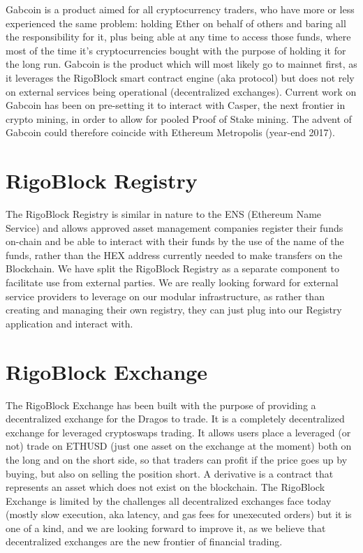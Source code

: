 \documentclass[9pt,oneside]{amsart}
\begin{document}
\begin{multicols}{2}
Gabcoin is a product aimed for all cryptocurrency traders, who have more or less experienced the same problem: holding Ether on behalf of others and baring all the responsibility for it, plus being able at any time to access those funds, where most of the time it’s cryptocurrencies bought with the purpose of holding it for the long run.
Gabcoin is the product which will most likely go to mainnet first, as it leverages the RigoBlock smart contract engine (aka protocol) but does not rely on external services being operational (decentralized exchanges). Current work on Gabcoin has been on pre-setting it to interact with Casper, the next frontier in crypto mining, in order to allow for pooled Proof of Stake mining. The advent of Gabcoin could therefore coincide with Ethereum Metropolis (year-end 2017).

\section{RigoBlock Registry}
The RigoBlock Registry is similar in nature to the ENS (Ethereum Name Service) and allows approved asset management companies register their funds on-chain and be able to interact with their funds by the use of the name of the funds, rather than the HEX address currently needed to make transfers on the Blockchain. We have split the RigoBlock Registry as a separate component to facilitate use from external parties. We are really looking forward for external service providers to leverage on our modular infrastructure, as rather than creating and managing their own registry, they can just plug into our Registry application and interact with.

\section{RigoBlock Exchange}
The RigoBlock Exchange has been built with the purpose of providing a decentralized exchange for the Dragos to trade. It is a completely decentralized exchange for leveraged cryptoswaps trading. It allows users place a leveraged (or not) trade on ETHUSD (just one asset on the exchange at the moment) both on the long and on the short side, so that traders can profit if the price goes up by buying, but also on selling the position short. A derivative is a contract that represents an asset which does not exist on the blockchain.
The RigoBlock Exchange is limited by the challenges all decentralized exchanges face today (mostly slow execution, aka latency, and gas fees for unexecuted orders) but it is one of a kind, and we are looking forward to improve it, as we believe that decentralized exchanges are the new frontier of financial trading.


\end{multicols}
\end{document}
